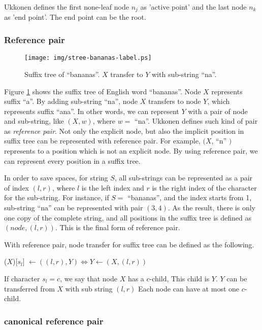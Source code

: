 \documentclass{article}
\begin{document}
Ukkonen defines the first none-leaf node $n_j$ as 'active point' and the last
node $n_k$ as 'end point'. The end point can be the root.

\subsubsection{Reference pair}

\begin{figure}[htbp]
  \centering
  \texttt{[image: img/stree-bananas-label.ps]}
  \caption{Suffix tree of ``bananas''. $X$ transfer to $Y$ with sub-string ``na''.}
  \label{fig:stree-bananas-label}
\end{figure}

Figure \ref{fig:stree-bananas-label} shows the suffix tree of English word ``bananas''.
Node $X$ represents suffix ``a''. By adding sub-string ``na'', node $X$ transfers
to node $Y$, which represents suffix ``ana''.
In other words, we can
represent $Y$ with a pair of node and sub-string, like $(X, w)$, where $w=$ ``na''.
Ukkonen defines
such kind of pair as {\em reference pair}. Not only the explicit node, but also the
implicit position in suffix tree can be represented with reference pair. For example,
$(X$, ``n'' $)$ represents to a position which is not an explicit node. By using reference
pair, we can represent every position in a suffix tree.

In order to save spaces, for string $S$, all sub-strings can
be represented as a pair of index $(l, r)$, where $l$ is the left index and $r$ is the
right index of the character for the sub-string. For instance, if $S=$ ``bananas'', and the
index starts from 1, sub-string ``na'' can be represented with pair $(3, 4)$. As the result,
there is only one copy of the complete string, and all positions in the suffix tree
is defined as $(node, (l, r))$. This is the final form of reference pair.

With reference pair, node transfer for suffix tree can be defined as the following.

($X$)[$s_l$] $\gets ((l, r), Y) \iff Y \gets (X, (l, r))$

If character $s_l=c$, we say that node $X$ has a $c$-child, This child is $Y$.
$Y$ can be transferred from $X$ with sub string $(l, r)$
Each node can have at most one $c$-child.

\subsubsection{canonical reference pair}
\end{document}
